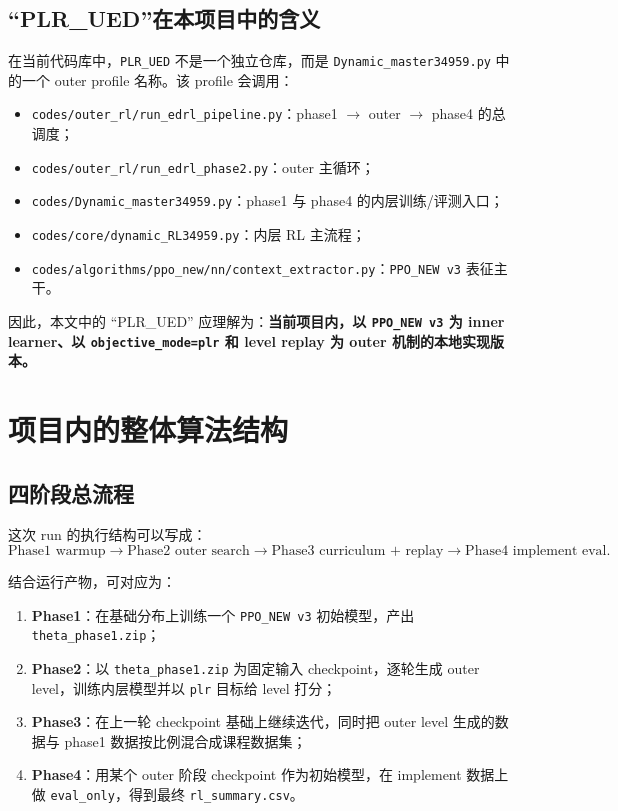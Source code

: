 \documentclass[11pt,a4paper]{ctexart}
\begin{document}
\subsection{“PLR\_UED”在本项目中的含义}
在当前代码库中，\texttt{PLR\_UED} 不是一个独立仓库，而是 \texttt{Dynamic\_master34959.py} 中的一个 outer profile 名称。该 profile 会调用：
\begin{itemize}[leftmargin=2.2em,itemsep=0.2em]
    \item \texttt{codes/outer\_rl/run\_edrl\_pipeline.py}：phase1 $\rightarrow$ outer $\rightarrow$ phase4 的总调度；
    \item \texttt{codes/outer\_rl/run\_edrl\_phase2.py}：outer 主循环；
    \item \texttt{codes/Dynamic\_master34959.py}：phase1 与 phase4 的内层训练/评测入口；
    \item \texttt{codes/core/dynamic\_RL34959.py}：内层 RL 主流程；
    \item \texttt{codes/algorithms/ppo\_new/nn/context\_extractor.py}：\texttt{PPO\_NEW v3} 表征主干。
\end{itemize}

因此，本文中的 ``PLR\_UED'' 应理解为：\textbf{当前项目内，以 \texttt{PPO\_NEW v3} 为 inner learner、以 \texttt{objective\_mode=plr} 和 level replay 为 outer 机制的本地实现版本。}

\section{项目内的整体算法结构}

\subsection{四阶段总流程}
这次 run 的执行结构可以写成：
\[
\text{Phase1 warmup} \rightarrow \text{Phase2 outer search} \rightarrow \text{Phase3 curriculum + replay} \rightarrow \text{Phase4 implement eval}.
\]

结合运行产物，可对应为：
\begin{enumerate}[leftmargin=2.2em,itemsep=0.25em]
    \item \textbf{Phase1}：在基础分布上训练一个 \texttt{PPO\_NEW v3} 初始模型，产出 \texttt{theta\_phase1.zip}；
    \item \textbf{Phase2}：以 \texttt{theta\_phase1.zip} 为固定输入 checkpoint，逐轮生成 outer level，训练内层模型并以 \texttt{plr} 目标给 level 打分；
    \item \textbf{Phase3}：在上一轮 checkpoint 基础上继续迭代，同时把 outer level 生成的数据与 phase1 数据按比例混合成课程数据集；
    \item \textbf{Phase4}：用某个 outer 阶段 checkpoint 作为初始模型，在 implement 数据上做 \texttt{eval\_only}，得到最终 \texttt{rl\_summary.csv}。
\end{enumerate}
\end{document}

